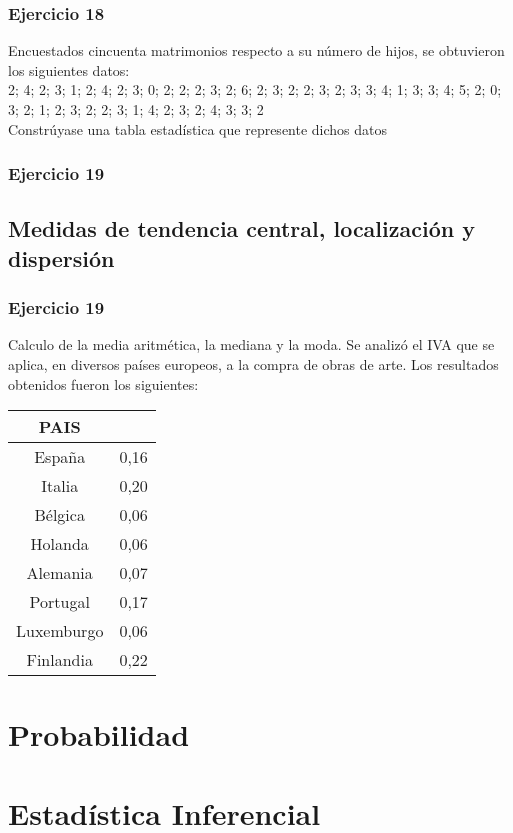 \documentclass[11pt,letterpaper]{report}
\begin{document}
      \subsection*{Ejercicio 18}
        Encuestados cincuenta matrimonios respecto a su número de hijos, se obtuvieron los siguientes datos:\\

        2; 4; 2; 3; 1; 2; 4; 2; 3; 0; 2; 2; 2; 3; 2; 6; 2; 3; 2; 2; 3; 2; 3; 3; 4; 1; 3; 3; 4; 5; 2; 0; 3; 2; 1; 2; 3; 2; 2; 3; 1; 4; 2; 3; 2; 4; 3; 3; 2\\

        Constrúyase una tabla estadística que represente dichos datos
      \subsection*{Ejercicio 19}



    \section{Medidas de tendencia central, localización y dispersión}
      \subsection*{Ejercicio 19}
        Calculo de la media aritmética, la mediana y la moda. Se analizó el IVA que se aplica, en diversos países europeos, a la compra de obras de arte. Los resultados obtenidos fueron los siguientes:
        \begin{table}[!h]
            \begin{tabular}{|c|c|}
                \hline
                PAIS& \\
                \hline
                España &0,16\\
                Italia &0,20\\
                Bélgica& 0,06\\
                Holanda& 0,06\\
                Alemania& 0,07\\
                Portugal& 0,17\\
                Luxemburgo& 0,06\\
                Finlandia& 0,22\\
                \hline
            \end{tabular}
        \end{table}

  \chapter{Probabilidad}
  \chapter{Estad\'istica Inferencial}
\end{document}
